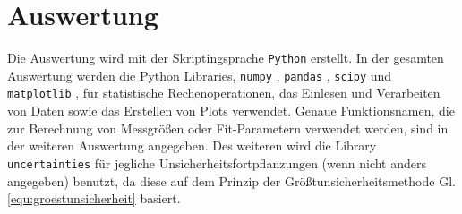 \section{Auswertung}
\label{sec:auswertung}
Die Auswertung wird mit der Skriptingsprache \verb|Python| \cite{PYTHON} erstellt.
In der gesamten Auswertung werden die Python Libraries, \verb|numpy| \cite{harris2020array}, \verb|pandas| \cite{reback2020pandas}, \verb|scipy| \cite{2020SciPy-NMeth} und \verb|matplotlib| \cite{Hunter:2007}, für statistische Rechenoperationen, das Einlesen und Verarbeiten von Daten sowie das Erstellen von Plots verwendet.
Genaue Funktionsnamen, die zur Berechnung von Messgrößen oder Fit-Parametern verwendet werden, sind in der weiteren Auswertung angegeben.
Des weiteren wird die Library \verb|uncertainties| \cite{UN} für jegliche Unsicherheitsfortpflanzungen (wenn nicht anders angegeben) benutzt, da diese auf dem Prinzip der Größtunsicherheitsmethode Gl. \ref{equ:groestunsicherheit} basiert.


